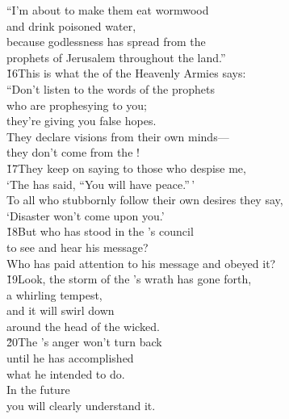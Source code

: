 \begin{poetry}
\poeml ``I'm about to make them eat wormwood \\
\poemll    and drink poisoned water, \\
\poeml because godlessness has spread from the \\
\poemll    prophets of Jerusalem throughout the land.'' \\
\poeml \v{16}This is what the  of the Heavenly Armies says: \\
\poeml ``Don't listen to the words of the prophets \\
\poemll    who are prophesying to you; \\
\poemlll       they're giving you false hopes. \\
\poeml They declare visions from their own minds--- \\
\poemll    they don't come from the ! \\
\poeml \v{17}They keep on saying to those who despise me, \\
\poemll    `The  has said, ``You will have peace.''\,' \\
\poeml To all who stubbornly follow their own desires they say, \\
\poemll    `Disaster won't come upon you.' \\
\poeml \v{18}But who has stood in the 's council \\
\poemll    to see and hear his message? \\
\poemlll       Who has paid attention to his message and obeyed it? \\
\poeml \v{19}Look, the storm of the 's wrath has gone forth, \\
\poemll    a whirling tempest, \\
\poeml and it will swirl down \\
\poemll    around the head of the wicked. \\
\poeml \v{20}The 's anger won't turn back \\
\poemll    until he has accomplished \\
\poemlll       what he intended to do. \\
\poeml In the future \\
\poemll    you will clearly understand it. \\

\end{poetry}
